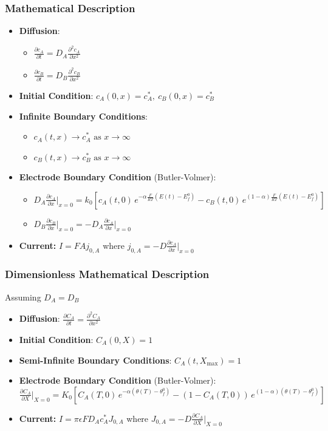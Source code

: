 \documentclass[aspectratio=169]{beamer}
\begin{document}
\begin{frame}
  \frametitle{Mathematical Description}
  \begin{itemize}
    \item \textbf{Diffusion}:
      \begin{itemize}
        \item $\frac{\partial c_A}{\partial t} = D_A
          \frac{\partial^2 c_A}{\partial x^2}$
        \item $\frac{\partial c_B}{\partial t} = D_B
          \frac{\partial^2 c_B}{\partial x^2}$
      \end{itemize}
    \item \textbf{Initial Condition}: $c_A(0, x) = c_A^*, \ c_B(0, x) = c_B^*$
    \item \textbf{Infinite Boundary Conditions}:
      \begin{itemize}
        \item $c_A(t, x) \to c_A^* \text{ as } x \to \infty$
        \item $c_B(t, x) \to c_B^* \text{ as } x \to \infty$
      \end{itemize}
    \item \textbf{Electrode Boundary Condition} (Butler-Volmer):
      \begin{itemize}
        \item $D_A \frac{\partial c_A}{\partial x}\bigg|_{x=0} =
          k_0 \left[ c_A(t,0)\, e^{-\alpha \frac{F}{RT} (E(t) - E^0_f)}
          - c_B(t,0)\, e^{(1-\alpha) \frac{F}{RT} (E(t) - E^0_f)} \right]$
        \item $D_B \frac{\partial c_B}{\partial x}\bigg|_{x=0} = - D_A
          \frac{\partial c_A}{\partial x}\bigg|_{x=0}$
      \end{itemize}
    \item \textbf{Current:} $I = F A j_{0, A}$ where $ j_{0, A} = - D
      \frac{\partial c_A}{\partial x}\bigg|_{x=0}$
  \end{itemize}
\end{frame}

\begin{frame}
  \frametitle{Dimensionless Mathematical Description}
  Assuming $D_A = D_B$
  \begin{itemize}
    \item \textbf{Diffusion}: $\frac{\partial C_A}{\partial t} =
      \frac{\partial^2 C_A}{\partial x^2}$
    \item \textbf{Initial Condition}: $C_A(0, X) = 1$
    \item \textbf{Semi-Infinite Boundary Conditions}: $C_A(t,
      X_{\text{max}}) = 1$
    \item \textbf{Electrode Boundary Condition} (Butler-Volmer):
      $\frac{\partial C_A}{\partial X}\bigg|_{X=0} =
      K_0 \left[ C_A(T,0)\, e^{-\alpha (\theta(T) - \theta^0_f)}
      - (1 - C_A(T,0))\, e^{(1-\alpha) (\theta(T) - \theta^0_f)} \right]$
    \item \textbf{Current:} $I = \pi \epsilon F D_A  c^*_A J_{0, A}$
      where $ J_{0, A} = - D
      \frac{\partial C_A}{\partial X}\bigg|_{X=0}$
  \end{itemize}
\end{frame}
\end{document}
